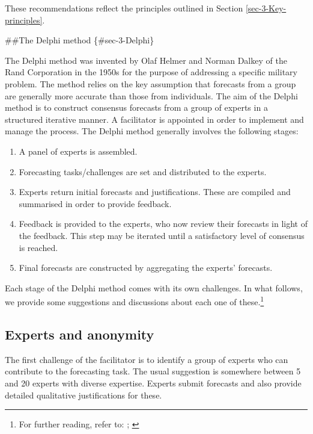\documentclass[]{book}
\providecommand{\tightlist}{%
  \setlength{\itemsep}{0pt}\setlength{\parskip}{0pt}}
\let\rmarkdownfootnote\footnote%
\def\footnote{\protect\rmarkdownfootnote}
\begin{document}
These recommendations reflect the principles outlined in Section \ref{sec-3-Key-principles}.

\#\#The Delphi method \{\#sec-3-Delphi\}

The Delphi method was invented by Olaf Helmer and Norman Dalkey of the Rand Corporation in the 1950s for the purpose of addressing a specific military problem. The method relies on the key assumption that forecasts from a group are generally more accurate than those from individuals. The aim of the Delphi method is to construct consensus forecasts from a group of experts in a structured iterative manner. A facilitator is appointed in order to implement and manage the process. The Delphi method generally involves the following stages:

\begin{enumerate}
\def\labelenumi{\arabic{enumi}.}
\tightlist
\item
  A panel of experts is assembled.
\item
  Forecasting tasks/challenges are set and distributed to the experts.
\item
  Experts return initial forecasts and justifications. These are compiled and summarised in order to provide feedback.
\item
  Feedback is provided to the experts, who now review their forecasts in light of the feedback. This step may be iterated until a satisfactory level of consensus is reached.
\item
  Final forecasts are constructed by aggregating the experts' forecasts.
\end{enumerate}

Each stage of the Delphi method comes with its own challenges. In what follows, we provide some suggestions and discussions about each one of these.\footnote{For further reading, refer to: \citet{Rowe2007}; \citet{RW99}}

\hypertarget{experts-and-anonymity}{%
\subsection*{Experts and anonymity}\label{experts-and-anonymity}}

The first challenge of the facilitator is to identify a group of experts who can contribute to the forecasting task. The usual suggestion is somewhere between 5 and 20 experts with diverse expertise. Experts submit forecasts and also provide detailed qualitative justifications for these.
\end{document}
